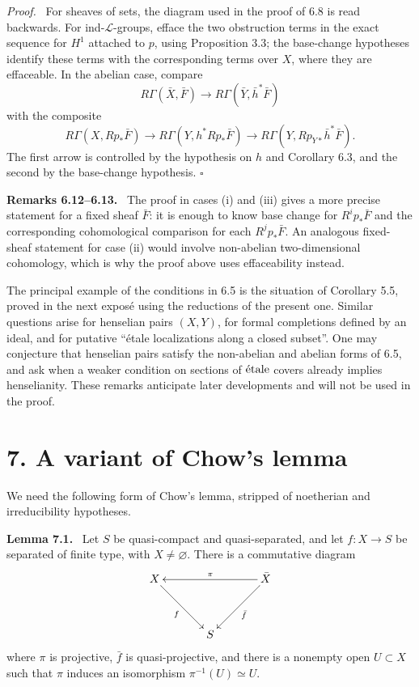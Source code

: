 \documentclass[12pt]{article}
\newcommand{\LL}{\mathcal L}
\newcommand{\etale}{\ifmmode\textnormal{\'etale}\else\'etale\fi}
\newcommand{\qedtext}{\hfill\(\square\)}
\newenvironment{statement}[1]{\par\medskip\noindent\textbf{#1.}\ }{\par\medskip}
\newenvironment{remarktext}[1]{\par\medskip\noindent\textbf{#1.}\ }{\par\medskip}
\newenvironment{prooftext}[1][Proof]{\par\noindent\emph{#1.}\ }{\par\medskip}
\begin{document}
\begin{prooftext}
For sheaves of sets, the diagram used in the proof of 6.8 is read backwards. For ind-\(\LL\)-groups, efface the two obstruction terms in the exact sequence for \(H^1\) attached to \(p\), using Proposition 3.3; the base-change hypotheses identify these terms with the corresponding terms over \(X\), where they are effaceable. In the abelian case, compare
\[
R\Gamma(\bar X,\bar F)\longrightarrow R\Gamma(\bar Y,\bar h^*\bar F)
\]
with the composite
\[
R\Gamma(X,Rp_*\bar F)\longrightarrow R\Gamma(Y,h^*Rp_*\bar F)
\longrightarrow R\Gamma(Y,Rp_{Y*}\bar h^*\bar F).
\]
The first arrow is controlled by the hypothesis on \(h\) and Corollary 6.3, and the second by the base-change hypothesis. \qedtext
\end{prooftext}

\begin{remarktext}{Remarks 6.12--6.13}
The proof in cases (i) and (iii) gives a more precise statement for a fixed sheaf \(\bar F\): it is enough to know base change for \(R^ip_*\bar F\) and the corresponding cohomological comparison for each \(R^jp_*\bar F\). An analogous fixed-sheaf statement for case (ii) would involve non-abelian two-dimensional cohomology, which is why the proof above uses effaceability instead.

The principal example of the conditions in 6.5 is the situation of Corollary 5.5, proved in the next expos\'e using the reductions of the present one. Similar questions arise for henselian pairs \((X,Y)\), for formal completions defined by an ideal, and for putative ``\'etale localizations along a closed subset''. One may conjecture that henselian pairs satisfy the non-abelian and abelian forms of 6.5, and ask when a weaker condition on sections of \(\etale\) covers already implies henselianity. These remarks anticipate later developments and will not be used in the proof.
\end{remarktext}

\section*{7. A variant of Chow's lemma}

We need the following form of Chow's lemma, stripped of noetherian and irreducibility hypotheses.

\begin{statement}{Lemma 7.1}
Let \(S\) be quasi-compact and quasi-separated, and let \(f:X\to S\) be separated of finite type, with \(X\ne\varnothing\). There is a commutative diagram
\[
\xymatrix@=1.25cm{
X\ar[rd]_f&&\bar X\ar[ll]_{\pi}\ar[ld]^{\bar f}\\
&S&
}
\]
where \(\pi\) is projective, \(\bar f\) is quasi-projective, and there is a nonempty open \(U\subset X\) such that \(\pi\) induces an isomorphism \(\pi^{-1}(U)\simeq U\).
\end{statement}
\end{document}
